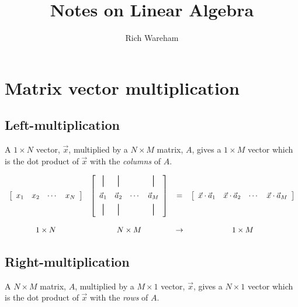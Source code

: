 \documentclass[a4paper]{article}
\title{Notes on Linear Algebra}
\author{Rich Wareham}
\newcommand{\vmatrixrule}{\rule[-0.5ex]{0.7pt}{1.5em}}
\begin{document}
\maketitle

\section{Matrix vector multiplication}

\subsection{Left-multiplication}

A $1 \times N$ vector, $\vec{x}$, multiplied by a $N \times M$ matrix, $A$,
gives a $1 \times M$ vector which is the dot product of $\vec{x}$ with the
\emph{columns} of $A$.

\[
\begin{array}{cccc}
\left[ \begin{array}{cccc} x_1 & x_2 & \cdots & x_N \end{array} \right] &
\left[
	\begin{array}{cccc}
		\vmatrixrule & \vmatrixrule &  & \vmatrixrule \\[1ex]
		\vec{a}_1 & \vec{a}_2 & \cdots & \vec{a}_M \\[1ex]
		\vmatrixrule & \vmatrixrule &  & \vmatrixrule 
	\end{array}
\right] &
= &
\left[ \begin{array}{cccc}
	\vec{x} \cdot \vec{a}_1 & \vec{x} \cdot \vec{a}_2 & \cdots & \vec{x} \cdot \vec{a}_M
      \end{array} \right] 
\\
\rule{0pt}{2em} 1 \times N & N \times M & \rightarrow & 1 \times M
\end{array}
\]

\subsection{Right-multiplication}

A $N \times M$ matrix, $A$, multiplied by a $M \times 1$ vector, $\vec{x}$,
gives a $N \times 1$ vector which is the dot product of $\vec{x}$ with the
\emph{rows} of $A$.
\end{document}
